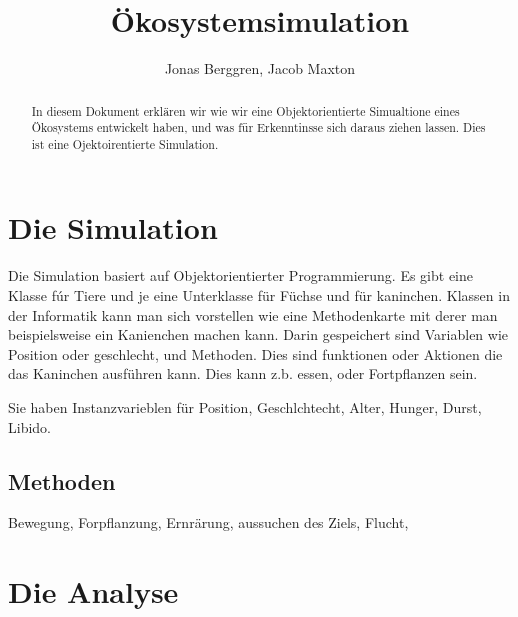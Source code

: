 \documentclass[12pt]{article}
\author{{\Large Jonas Berggren, Jacob Maxton}}
\title{{\myfont Ökosystemsimulation}}
\begin{document}
\maketitle
\tableofcontents
\newpage
\begin{abstract}
In diesem Dokument erklären wir wie wir eine Objektorientierte Simualtione eines Ökosystems entwickelt haben, und was für Erkenntinsse sich daraus ziehen lassen.
Dies ist eine Ojektoirentierte Simulation.
\end{abstract}
\section{Die Simulation}
Die Simulation basiert auf Objektorientierter Programmierung.
Es gibt eine Klasse fúr Tiere und je eine Unterklasse für Füchse und für kaninchen.
Klassen in der Informatik kann man sich vorstellen wie eine Methodenkarte mit derer man beispielsweise ein Kanienchen machen kann.
Darin gespeichert sind Variablen wie Position oder geschlecht, und Methoden.
Dies sind funktionen oder Aktionen die das Kaninchen ausführen kann.
Dies kann z.b. essen, oder Fortpflanzen sein.

Sie haben Instanzvarieblen für Position, Geschlchtecht, Alter, Hunger, Durst, Libido.
\subsection{Methoden}
Bewegung, Forpflanzung, Ernrärung, aussuchen des Ziels, Flucht, 
\section{Die Analyse}
\end{document}
